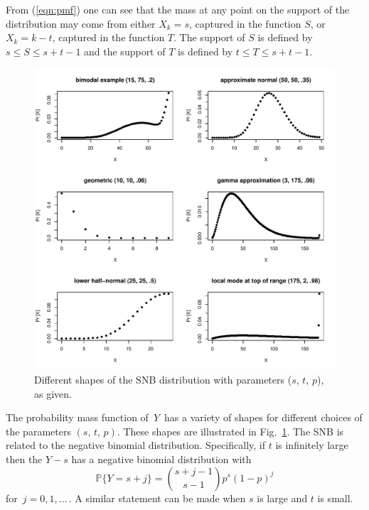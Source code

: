 \documentclass[12pt]{article}         %
\begin{document}
From (\ref{eqn:pmf}) one can see that the mass at any point on the support 
of the distribution may come from either $X_k = s$, captured in the 
function $S$, or $X_k = k-t$, captured in the function $T$. The support of 
$S$ is defined by $s \leq S \leq s+t-1$ and the support of $T$ is defined 
by $t \leq T \leq s+t-1$.

\begin{figure}[p!]
\begin{center}
\includegraphics[scale=.9]{shapes.pdf}
\end{center}
\caption{Different shapes of the SNB distribution with parameters ($s$, $t$, $p$), as given. \label{shapes.fig}}
\end{figure}

The probability mass function of $\,Y\,$ has a variety of shapes for different choices of the parameters $(s,\, t,\,p)$.
These shapes are illustrated in Fig.~\ref{shapes.fig}.
The SNB is related to the negative binomial distribution. Specifically, if 
$t$ is infinitely large then the $Y-s$ has a negative binomial distribution 
with
\begin{equation*}                                    %
   \mathbb{P}\{Y=s+j \}        \label{nb1.eq}
          = {{s+j-1}\choose{s-1}} p^s (1-p)^j
\end{equation*}
for $\,j=0, 1,\ldots\,$. A similar statement can be made when $s$ is large
and $t$ is small.
\end{document}
